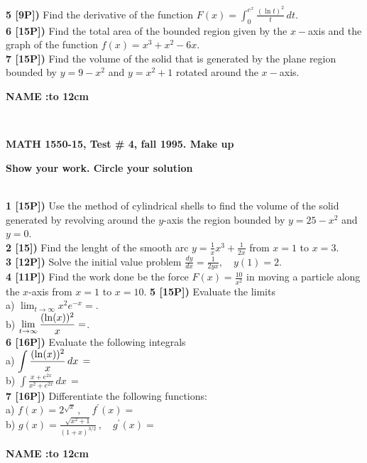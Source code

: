 \documentclass[12pt]{article}
\begin{document}
{\bf 5 [9P])} Find the derivative of the function
${\displaystyle F(x) = \int_0^{e^x} \frac{ ( \ln t)^2}{t}\, dt}$.
\\ %
{\bf 6 [15P])} Find the total area of the bounded region given by the
${\displaystyle x-}$axis and the graph of the function
${\displaystyle f(x) = x^3 + x^2 - 6x }$.
\\ %
{\bf 7 [15P])} Find the volume of the solid that is generated by the plane region bounded by
${\displaystyle y = 9 - x^2 }$ and ${\displaystyle y = x^2 + 1}$ rotated
around the ${\displaystyle x-}$axis.
\centerline{\large\bf NAME :\hbox to 12cm{\hrulefill}}
\\ %
\centerline{\bf MATH 1550-15, Test \# 4, fall 1995. Make up}
\centerline{\bf Show your work. Circle your solution}
\\ %
{\bf 1 [15P])} Use the method of cylindrical shells to find
the volume of the solid generated by revolving around the
$y$-axis the region bounded by $y= 25 - x^2$ and
$y = 0$.
\\ %
{\bf 2 [15])} Find
the lenght of the smooth arc  ${\displaystyle y = \frac{1}{x} x^3 + \frac{1}{2x}}$ from $x=1$ to $x=3$.
\\ %
{\bf 3 [12P])} Solve the initial value problem
${\displaystyle \frac{dy}{dx} = \frac{1}{2yx},\quad
y(1) =2}$.
\\ %
{\bf 4 [11P])} Find the work done be the force ${\displaystyle
F(x) = \frac{10}{x^2}}$
in moving a particle along the $x$-axis from $x=1$ to $x=10$.
{\bf 5 [15P])} Evaluate the limits
\\ %
a) ${\displaystyle \lim_{t\to \infty} x^2e^{-x}=}$.
\\ %
b) ${\displaystyle \lim_{t\to \infty} \frac{({\rm ln}(x))^2}{x} = }$.
\\ %
{\bf 6 [16P])}
Evaluate the following integrals
\\ %
a) ${\displaystyle \int \frac{({\rm ln}(x))^2}{x}\, dx \, = }$
\\ %
b) ${\displaystyle \int \frac{x + e^{2x}}{x^2+e^{2x}}\, dx \, = }$
\\ %
{\bf 7 [16P])} Differentiate the following functions:
\\ %
a) ${\displaystyle f(x) = 2^{\sqrt{x}}\, ,\quad f^\prime (x) =  }$
\\ %
b) ${\displaystyle g(x)  = \frac{\sqrt{x^2+1}}{(1+x)^{3/2}}\, , \quad g^\prime (x) =}$
\centerline{\large\bf NAME :\hbox to 12cm{\hrulefill}}
\end{document}
